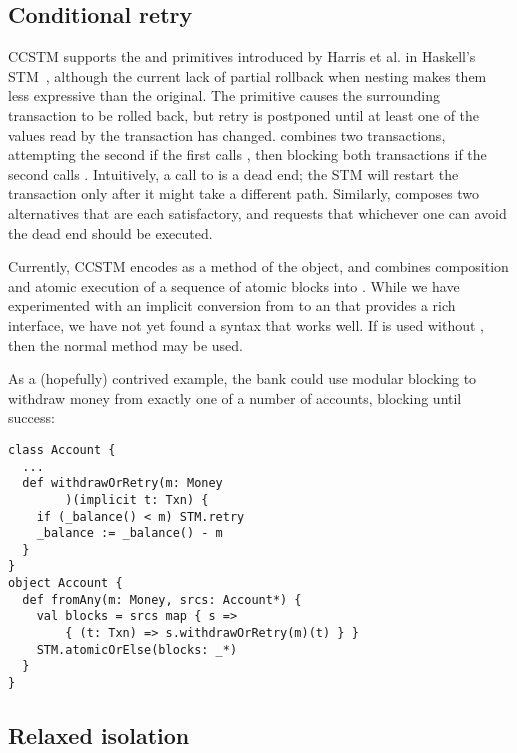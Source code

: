 \subsection{Conditional retry}

CCSTM supports the  and  primitives introduced by
Harris et al. in Haskell's STM~\cite{harris05ctm}, although the current
lack of partial rollback when nesting makes them less expressive than the original.
The  primitive causes the surrounding transaction to be rolled
back, but retry is postponed until at least one of the values read by
the transaction has changed.   combines two transactions,
attempting the second if the first calls , then blocking
both transactions if the second calls .  Intuitively, a call
to  is a dead end; the STM will restart the transaction
only after it might take a different path.  Similarly, 
composes two alternatives that are each satisfactory, and requests that
whichever one can avoid the dead end should be executed.

Currently, CCSTM encodes  as a method of the  object, and 
combines composition and atomic execution of a sequence of atomic blocks into
\code{STM.atomicOrElse[}\code{](blocks: (}\code{ => }\code{)*): }.
While we have experimented with an implicit conversion from 
\code{ => } to an  that provides a
rich interface, we have not yet found a syntax that works well.  If
 is used without , then the normal 
method may be used.

As a (hopefully) contrived example,
the bank could use modular blocking to withdraw money from exactly one of a number of
accounts, blocking until success:
\lstset{numbers=none}
\lstset{xleftmargin=0.125in}
\begin{lstlisting}
class Account {
  ...
  def withdrawOrRetry(m: Money
        )(implicit t: Txn) {
    if (_balance() < m) STM.retry
    _balance := _balance() - m
  }
}
object Account {
  def fromAny(m: Money, srcs: Account*) {
    val blocks = srcs map { s =>
        { (t: Txn) => s.withdrawOrRetry(m)(t) } }
    STM.atomicOrElse(blocks: _*)
  }
}
\end{lstlisting}
\lstset{numbers=left}
\lstset{xleftmargin=0.25in}


\subsection{Relaxed isolation}
\label{sec:unrecordedread}


